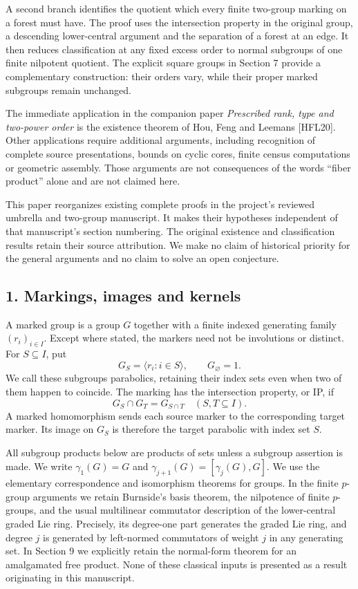 \documentclass[
  11pt,
  a4paper,
]{article}
\begin{document}
A second branch identifies the quotient which every finite two-group
marking on a forest must have. The proof uses the intersection property
in the original group, a descending lower-central argument and the
separation of a forest at an edge. It then reduces classification at any
fixed excess order to normal subgroups of one finite nilpotent quotient.
The explicit square groups in Section 7 provide a complementary
construction: their orders vary, while their proper marked subgroups
remain unchanged.

The immediate application in the companion paper \emph{Prescribed rank,
type and two-power order} is the existence theorem of Hou, Feng and
Leemans {[}HFL20{]}. Other applications require additional arguments,
including recognition of complete source presentations, bounds on cyclic
cores, finite census computations or geometric assembly. Those arguments
are not consequences of the words ``fiber product'' alone and are not
claimed here.

This paper reorganizes existing complete proofs in the project's
reviewed umbrella and two-group manuscript. It makes their hypotheses
independent of that manuscript's section numbering. The original
existence and classification results retain their source attribution. We
make no claim of historical priority for the general arguments and no
claim to solve an open conjecture.

\subsection{1. Markings, images and
kernels}\label{markings-images-and-kernels}

A marked group is a group \(G\) together with a finite indexed
generating family \((r_i)_{i\in I}\). Except where stated, the markers
need not be involutions or distinct. For \(S\subseteq I\), put \[
G_S=\langle r_i:i\in S\rangle,\qquad G_\varnothing=1.
\] We call these subgroups parabolics, retaining their index sets even
when two of them happen to coincide. The marking has the intersection
property, or IP, if \[
G_S\cap G_T=G_{S\cap T}\quad(S,T\subseteq I).
\tag{M1}
\] A marked homomorphism sends each source marker to the corresponding
target marker. Its image on \(G_S\) is therefore the target parabolic
with index set \(S\).

All subgroup products below are products of sets unless a subgroup
assertion is made. We write \(\gamma_1(G)=G\) and
\(\gamma_{j+1}(G)=[\gamma_j(G),G]\). We use the elementary
correspondence and isomorphism theorems for groups. In the finite
\(p\)-group arguments we retain Burnside's basis theorem, the nilpotence
of finite \(p\)-groups, and the usual multilinear commutator description
of the lower-central graded Lie ring. Precisely, its degree-one part
generates the graded Lie ring, and degree \(j\) is generated by
left-normed commutators of weight \(j\) in any generating set. In
Section 9 we explicitly retain the normal-form theorem for an
amalgamated free product. None of these classical inputs is presented as
a result originating in this manuscript.
\end{document}

